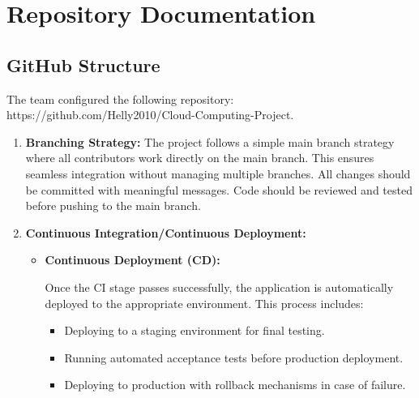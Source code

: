 \documentclass{llncs}
\begin{document}
\section{Repository Documentation}
\subsection{GitHub Structure}

The team configured the following repository: https://github.com/Helly2010/Cloud-Computing-Project.

\begin{enumerate}
    \item \textbf{Branching Strategy:} \newline
          The project follows a simple main branch strategy where all contributors work directly on the main branch.
          This ensures seamless integration without managing multiple branches. All changes should be committed with meaningful messages.
          Code should be reviewed and tested before pushing to the main branch.

    \item \textbf{Continuous Integration/Continuous Deployment:}
          \begin{itemize}
              \item \textbf{Continuous Deployment (CD):}

                    Once the CI stage passes successfully, the application is automatically deployed to the appropriate environment. This process includes:
                    \begin{itemize}
                        \item Deploying to a staging environment for final testing.
                        \item Running automated acceptance tests before production deployment.
                        \item Deploying to production with rollback mechanisms in case of failure.
                    \end{itemize}

          \end{itemize}
\end{enumerate}
\end{document}
